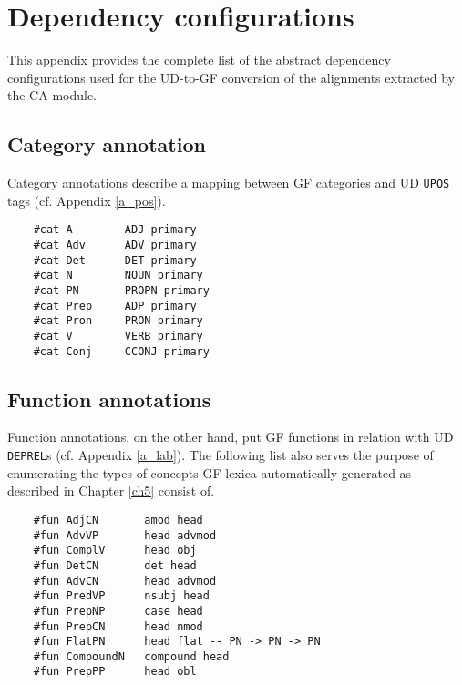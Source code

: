 \chapter{Dependency configurations} \label{c}
This appendix provides the complete list of the abstract dependency configurations used for the UD-to-GF conversion of the alignments extracted by the CA module.

\section{Category annotation}
Category annotations describe a mapping between GF categories and UD \texttt{UPOS} tags (cf. Appendix \ref{a_pos}). \smallskip

\begin{verbatim}
    #cat A        ADJ primary
    #cat Adv      ADV primary
    #cat Det      DET primary
    #cat N        NOUN primary
    #cat PN       PROPN primary
    #cat Prep     ADP primary
    #cat Pron     PRON primary
    #cat V        VERB primary
    #cat Conj     CCONJ primary
\end{verbatim}

\section{Function annotations}
Function annotations, on the other hand, put GF functions in relation with UD \texttt{DEPREL}s (cf. Appendix \ref{a_lab}). 
The following list also serves the purpose of enumerating the types of concepts GF lexica automatically generated as described in Chapter \ref{ch5} consist of. \smallskip

\begin{verbatim}
    #fun AdjCN       amod head
    #fun AdvVP       head advmod
    #fun ComplV      head obj
    #fun DetCN       det head
    #fun AdvCN       head advmod
    #fun PredVP      nsubj head
    #fun PrepNP      case head
    #fun PrepCN      head nmod
    #fun FlatPN      head flat -- PN -> PN -> PN
    #fun CompoundN   compound head
    #fun PrepPP      head obl
\end{verbatim}
